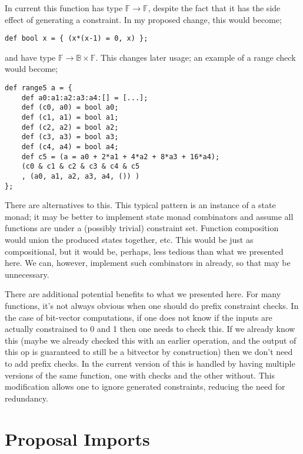\documentclass[
    9pt,            
    techreport,       
    affiltop,       
]{art}
\begin{document}
In current \VampIR{} this function has type $\mathbb{F} \rightarrow \mathbb{F}$, despite the fact that it has the side effect of generating a constraint. In my proposed change, this would become;

\begin{verbatim}
def bool x = { (x*(x-1) = 0, x) };
\end{verbatim}

and have type $\mathbb{F} \rightarrow \mathbb{B} \times \mathbb{F}$. This changes later usage; an example of a range check would become;

\begin{verbatim}
def range5 a = {
    def a0:a1:a2:a3:a4:[] = [...];
    def (c0, a0) = bool a0;
    def (c1, a1) = bool a1;
    def (c2, a2) = bool a2;
    def (c3, a3) = bool a3;
    def (c4, a4) = bool a4;
    def c5 = (a = a0 + 2*a1 + 4*a2 + 8*a3 + 16*a4);
    (c0 & c1 & c2 & c3 & c4 & c5
    , (a0, a1, a2, a3, a4, ()) )
};
\end{verbatim}

There are alternatives to this. This typical pattern is an instance of a state monad; it may be better to implement state monad combinators and assume all functions are under a (possibly trivial) constraint set. Function composition would union the produced states together, etc. This would be just as compositional, but it would be, perhaps, less tedious than what we presented here. We can, however, implement such combinators in \VampIR{} already, so that may be unnecessary.

There are additional potential benefits to what we presented here. For many functions, it's not always obvious when one should do prefix constraint checks. In the case of bit-vector computations, if one does not know if the inputs are actually constrained to 0 and 1 then one needs to check this. If we already know this (maybe we already checked this with an earlier operation, and the output of this op is guaranteed to still be a bitvector by construction) then we don't need to add prefix checks. In the current version of \VampIR{} this is handled by having multiple versions of the same function, one with checks and the other without. This modification allows one to ignore generated constraints, reducing the need for redundancy.

\section{Proposal \VampIR{} Imports}
\label{sec:imports}
\end{document}
